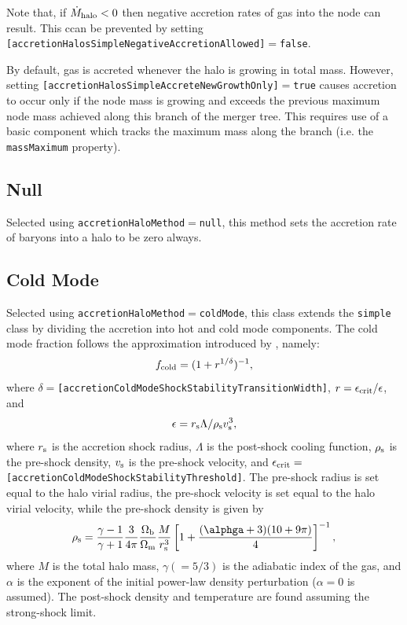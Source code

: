 Note that, if $\dot{M}_{\rm halo} < 0$ then negative accretion rates of gas into the node can result. This ccan be prevented by setting {\tt [accretionHalosSimpleNegativeAccretionAllowed]}$=${\tt false}.

By default, gas is accreted whenever the halo is growing in total mass. However, setting {\tt [accretionHalosSimpleAccreteNewGrowthOnly]}$=${\tt true} causes accretion to occur only if the node mass is growing and exceeds the previous maximum node mass achieved along this branch of the merger tree. This requires use of a basic component which tracks the maximum mass along the branch (i.e. the {\tt massMaximum} property).

\subsection{Null}\label{phys:accretionHalo:accretionHaloNull}

Selected using {\tt accretionHaloMethod}$=${\tt null}, this method sets the accretion rate of baryons into a halo to be zero always.

\subsection{Cold Mode}\label{phys:accretionHalo:accretionHaloColdMode}

Selected using {\tt accretionHaloMethod}$=${\tt coldMode}, this class extends the {\tt simple} class by dividing the accretion into hot and cold mode components. The cold mode fraction follows the approximation introduced by \cite{benson_cold_2010}, namely:
\begin{equation}
f_{\rm cold}=(1+r^{1/\delta})^{-1},
\end{equation}
where $\delta=${\tt [accretionColdModeShockStabilityTransitionWidth]}, $r = \epsilon_{\rm crit}/\epsilon$, and
\begin{equation}
\epsilon = r_{\rm s} \Lambda / \rho_{\rm s} v_{\rm s}^3,
\end{equation}
where $r_{\rm s}$ is the accretion shock radius, $\Lambda$ is the post-shock cooling function, $\rho_{\rm s}$ is the pre-shock density, $v_{\rm s}$ is the pre-shock velocity, and $\epsilon_{\rm crit}=${\tt [accretionColdModeShockStabilityThreshold]}. The pre-shock radius is set equal to the halo virial radius, the pre-shock velocity is set equal to the halo virial velocity, while the pre-shock density is given by
\begin{equation}
\rho_{\rm s} = {\gamma - 1 \over \gamma + 1} { 3 \over 4 \pi } { \Omega_{\rm b} \over \Omega_{\rm m} } {M \over r_{\rm s}^3} \left[ 1 + {(\alphga + 3) (10 + 9 \pi) \over 4} \right]^{-1},
\end{equation}
where $M$ is the total halo mass, $\gamma(=5/3)$ is the adiabatic index of the gas, and $\alpha$ is the exponent of the initial power-law density perturbation ($\alpha=0$ is assumed). The post-shock density and temperature are found assuming the strong-shock limit.

